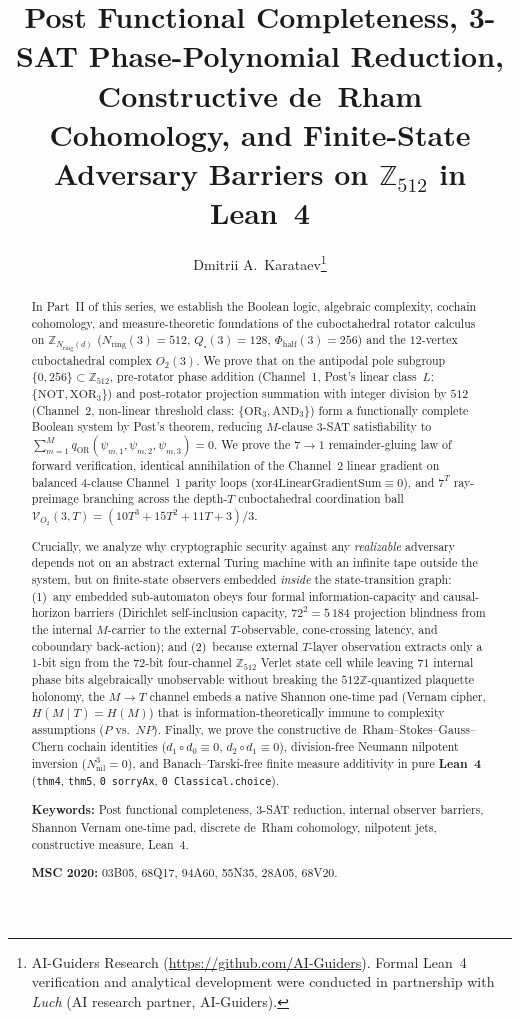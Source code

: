 \documentclass[11pt,a4paper]{article}
\title{\textbf{Post Functional Completeness, 3-SAT Phase-Polynomial Reduction, Constructive de~Rham Cohomology, and Finite-State Adversary Barriers on $\mathbb{Z}_{512}$ in Lean~4}}
\author{Dmitrii A.~Karataev\thanks{AI-Guiders Research (\url{https://github.com/AI-Guiders}). Formal Lean~4 verification and analytical development were conducted in partnership with \emph{Luch} (AI research partner, AI-Guiders).}}
\date{}
\theoremstyle{plain}
\theoremstyle{definition}
\begin{document}
\maketitle

\begin{abstract}
In Part~II of this series, we establish the Boolean logic, algebraic complexity, cochain cohomology, and measure-theoretic foundations of the cuboctahedral rotator calculus on $\mathbb{Z}_{N_{\mathrm{ring}}(d)}$ ($N_{\mathrm{ring}}(3)=512$, $Q_\square(3)=128$, $\Phi_{\mathrm{half}}(3)=256$) and the $12$-vertex cuboctahedral complex $O_2(3)$. We prove that on the antipodal pole subgroup $\{0,256\}\subset\mathbb{Z}_{512}$, pre-rotator phase addition (Channel~1, Post's linear class~$L$: $\{\mathrm{NOT},\mathrm{XOR}_3\}$) and post-rotator projection summation with integer division by $512$ (Channel~2, non-linear threshold class: $\{\mathrm{OR}_3,\mathrm{AND}_3\}$) form a functionally complete Boolean system by Post's theorem, reducing $M$-clause 3-SAT satisfiability to $\sum_{m=1}^M q_{\mathrm{OR}}(\psi_{m,1},\psi_{m,2},\psi_{m,3}) = 0$. We prove the $7\to 1$ remainder-gluing law of forward verification, identical annihilation of the Channel~2 linear gradient on balanced $4$-clause Channel~1 parity loops ($\mathrm{xor4LinearGradientSum}\equiv 0$), and $7^T$ ray-preimage branching across the depth-$T$ cuboctahedral coordination ball $\mathcal{V}_{O_2}(3,T) = (10T^3+15T^2+11T+3)/3$.

Crucially, we analyze why cryptographic security against any \emph{realizable} adversary depends not on an abstract external Turing machine with an infinite tape outside the system, but on finite-state observers embedded \emph{inside} the state-transition graph: (1)~any embedded sub-automaton obeys four formal information-capacity and causal-horizon barriers (Dirichlet self-inclusion capacity, $72^2 = 5\,184$ projection blindness from the internal $M$-carrier to the external $T$-observable, cone-crossing latency, and coboundary back-action); and (2)~because external $T$-layer observation extracts only a $1$-bit sign from the $72$-bit four-channel $\mathbb{Z}_{512}$ Verlet state cell while leaving $71$ internal phase bits algebraically unobservable without breaking the $512\mathbb{Z}$-quantized plaquette holonomy, the $M\to T$ channel embeds a native Shannon one-time pad (Vernam cipher, $H(M\mid T)=H(M)$) that is information-theoretically immune to complexity assumptions ($P$ vs.\ $NP$). Finally, we prove the constructive de~Rham--Stokes--Gauss--Chern cochain identities ($d_1\circ d_0\equiv 0$, $d_2\circ d_1\equiv 0$), division-free Neumann nilpotent inversion ($N_{\mathrm{nil}}^3=0$), and Banach--Tarski-free finite measure additivity in pure \textbf{Lean~4} (\texttt{thm4}, \texttt{thm5}, \texttt{0 sorryAx}, \texttt{0 Classical.choice}).

\medskip\noindent
\textbf{Keywords:} Post functional completeness, 3-SAT reduction, internal observer barriers, Shannon Vernam one-time pad, discrete de~Rham cohomology, nilpotent jets, constructive measure, Lean~4.

\smallskip\noindent
\textbf{MSC 2020:} 03B05, 68Q17, 94A60, 55N35, 28A05, 68V20.
\end{abstract}
\end{document}
